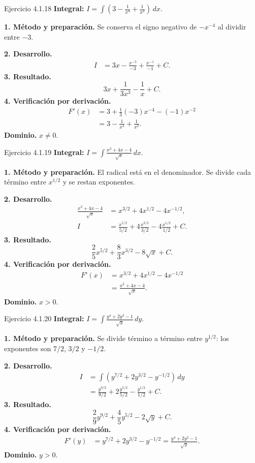 \begin{examplebox}{Ejercicio 4.1.18}
\textbf{Integral:} $\displaystyle I=\int \left(3-\frac1{x^4}+\frac1{x^2}\right)\,dx$.

\textbf{1. Método y preparación.} Se conserva el signo negativo de $-x^{-4}$ al dividir entre $-3$.

\textbf{2. Desarrollo.}
\begin{align*}
I&=3x-\frac{x^{-3}}{-3}+\frac{x^{-1}}{-1}+C.
\end{align*}
\textbf{3. Resultado.}
\[
3x+\frac1{3x^3}-\frac1x+C.
\]
\textbf{4. Verificación por derivación.}
\begin{align*}
F'(x)&=3+\frac13(-3)x^{-4}-(-1)x^{-2}\\&=3-\frac1{x^4}+\frac1{x^2}.
\end{align*}
\textbf{Dominio.} $x\ne0$.
\end{examplebox}

\begin{examplebox}{Ejercicio 4.1.19}
\textbf{Integral:} $\displaystyle I=\int \frac{x^2+4x-4}{\sqrt x}\,dx$.

\textbf{1. Método y preparación.} El radical está en el denominador. Se divide cada término entre $x^{1/2}$ y se restan exponentes.

\textbf{2. Desarrollo.}
\begin{align*}
\frac{x^2+4x-4}{\sqrt x}&=x^{3/2}+4x^{1/2}-4x^{-1/2},\\I&=\frac{x^{5/2}}{5/2}+4\frac{x^{3/2}}{3/2}-4\frac{x^{1/2}}{1/2}+C.
\end{align*}
\textbf{3. Resultado.}
\[
\frac25x^{5/2}+\frac83x^{3/2}-8\sqrt x+C.
\]
\textbf{4. Verificación por derivación.}
\begin{align*}
F'(x)&=x^{3/2}+4x^{1/2}-4x^{-1/2}\\&=\frac{x^2+4x-4}{\sqrt x}.
\end{align*}
\textbf{Dominio.} $x>0$.
\end{examplebox}

\begin{examplebox}{Ejercicio 4.1.20}
\textbf{Integral:} $\displaystyle I=\int \frac{y^4+2y^2-1}{\sqrt y}\,dy$.

\textbf{1. Método y preparación.} Se divide término a término entre $y^{1/2}$: los exponentes son $7/2$, $3/2$ y $-1/2$.

\textbf{2. Desarrollo.}
\begin{align*}
I&=\int(y^{7/2}+2y^{3/2}-y^{-1/2})\,dy\\&=\frac{y^{9/2}}{9/2}+2\frac{y^{5/2}}{5/2}-\frac{y^{1/2}}{1/2}+C.
\end{align*}
\textbf{3. Resultado.}
\[
\frac29y^{9/2}+\frac45y^{5/2}-2\sqrt y+C.
\]
\textbf{4. Verificación por derivación.}
\begin{align*}
F'(y)&=y^{7/2}+2y^{3/2}-y^{-1/2}=\frac{y^4+2y^2-1}{\sqrt y}.
\end{align*}
\textbf{Dominio.} $y>0$.
\end{examplebox}

